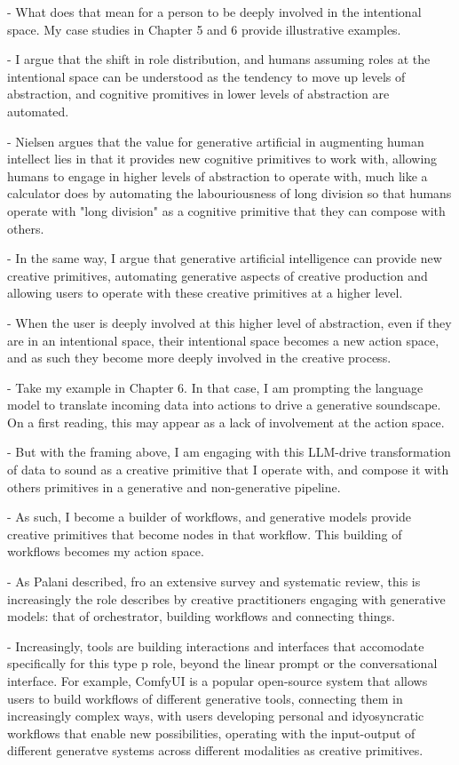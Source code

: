 - What does that mean for a person to be deeply involved in the intentional space. My case studies in Chapter 5 and 6 provide illustrative examples. 

- I argue that the shift in role distribution, and humans assuming roles at the intentional space can be understood as the tendency to move up levels of abstraction, and cognitive promitives in lower levels of abstraction are automated. 

- Nielsen argues that the value for generative artificial in augmenting human intellect lies in that it provides new cognitive primitives to work with, allowing humans to engage in higher levels of abstraction to operate with, much like a calculator does by automating the labouriousness of long division so that humans operate with "long division" as a cognitive primitive that they can compose with others. 

- In the same way, I argue that generative artificial intelligence can provide new creative primitives, automating generative aspects of creative production and allowing users to operate with these creative primitives at a higher level. 

- When the user is deeply involved at this higher level of abstraction, even if they are in an intentional space, their intentional space becomes a new action space, and as such they become more deeply involved in the creative process. 

- Take my example in Chapter 6. In that case, I am prompting the language model to translate incoming data into actions to drive a generative soundscape. On a first reading, this may appear as a lack of involvement at the action space. 

- But with the framing above, I am engaging with this LLM-drive transformation of data to sound as a creative primitive that I operate with, and compose it with others primitives in a generative and non-generative pipeline.

- As such, I become a builder of workflows, and generative models provide creative primitives that become nodes in that workflow. This building of workflows becomes my action space. 

- As Palani described, fro an extensive survey and systematic review, this is increasingly the role describes by creative practitioners engaging with generative models: that of orchestrator, building workflows and connecting things. 


- Increasingly, tools are building interactions and interfaces that accomodate specifically for this type p role, beyond the linear prompt or the conversational interface. For example, ComfyUI is a popular open-source system that allows users to build workflows of different generative tools, connecting them in increasingly complex ways, with users developing personal and idyosyncratic workflows that enable new possibilities, operating with the input-output of different generatve systems across different modalities as creative primitives. 

